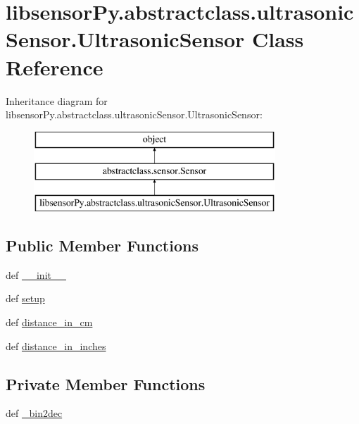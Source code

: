 \hypertarget{classlibsensorPy_1_1abstractclass_1_1ultrasonicSensor_1_1UltrasonicSensor}{}\section{libsensor\+Py.\+abstractclass.\+ultrasonic\+Sensor.\+Ultrasonic\+Sensor Class Reference}
\label{classlibsensorPy_1_1abstractclass_1_1ultrasonicSensor_1_1UltrasonicSensor}
Inheritance diagram for libsensor\+Py.\+abstractclass.\+ultrasonic\+Sensor.\+Ultrasonic\+Sensor\+:\begin{figure}[H]
\begin{center}
\leavevmode
\includegraphics[height=3.000000cm]{classlibsensorPy_1_1abstractclass_1_1ultrasonicSensor_1_1UltrasonicSensor}
\end{center}
\end{figure}
\subsection*{Public Member Functions}
\begin{DoxyCompactItemize}
\item 
def \hyperlink{classlibsensorPy_1_1abstractclass_1_1ultrasonicSensor_1_1UltrasonicSensor_af64550ffcf4c5b4472e61c303e8598ad}{\+\_\+\+\_\+init\+\_\+\+\_\+}
\item 
def \hyperlink{classlibsensorPy_1_1abstractclass_1_1ultrasonicSensor_1_1UltrasonicSensor_a7e162f0807663fd3266b271ea1bb56ca}{setup}
\item 
def \hyperlink{classlibsensorPy_1_1abstractclass_1_1ultrasonicSensor_1_1UltrasonicSensor_a80c74241023e893f443f8e9f1cafe735}{distance\+\_\+in\+\_\+cm}
\item 
def \hyperlink{classlibsensorPy_1_1abstractclass_1_1ultrasonicSensor_1_1UltrasonicSensor_a0d33931ea8024828568f01ca517cac56}{distance\+\_\+in\+\_\+inches}
\end{DoxyCompactItemize}
\subsection*{Private Member Functions}
\begin{DoxyCompactItemize}
\item 
def \hyperlink{classlibsensorPy_1_1abstractclass_1_1ultrasonicSensor_1_1UltrasonicSensor_acb2a3d6d6efebe7b660939e68e66edee}{\+\_\+bin2dec}
\end{DoxyCompactItemize}
